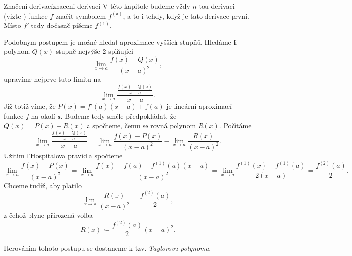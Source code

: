 \begin{remark}{Značení derivací}{znaceni-derivaci}
 V této kapitole budeme vždy $n$-tou derivaci (vizte
 ) funkce $f$ značit symbolem
 $f^{(n)}$, a to i tehdy, když je tato derivace první. Místo $f'$ tedy dočasně 
 píšeme $f^{(1)}$.
\end{remark}

Podobným postupem je možné hledat aproximace vyšších stupňů. Hledáme-li polynom
$Q(x)$ stup\-ně nejvýše $2$ splňující
\[
 \lim_{x \to a} \frac{f(x) - Q(x)}{(x-a)^2},
\]
upravíme nejprve tuto limitu na
\[
 \lim_{x \to a} \frac{\frac{f(x) - Q(x)}{x-a}}{x-a}.
\]
Již totiž víme, že $P(x) = f'(a)(x-a) + f(a)$ je lineární aproximací funkce $f$
na okolí $a$. Budeme tedy směle předpokládat, že $Q(x) = P(x) + R(x)$ a
spočteme, čemu se rovná polynom $R(x)$. Počítáme
\[
 \lim_{x \to a} \frac{\frac{f(x) - Q(x)}{x-a}}{x-a} = \lim_{x \to a} \frac{f(x)
 - P(x)}{(x-a)^2} - \lim_{x \to a} \frac{R(x)}{(x-a)^2}.
\]
Užitím \hyperref[thm:lhospitalovo-pravidlo]{l'Hospitalova pravidla} spočteme
\[
 \lim_{x \to a} \frac{f(x) - P(x)}{(x-a)^2} = \lim_{x \to a} \frac{f(x) - f(a) -
 f^{(1)}(a)(x-a)}{(x-a)^2} = \lim_{x \to a} \frac{f^{(1)}(x) -
f^{(1)}(a)}{2(x-a)} = \frac{f^{(2)}(a)}{2}.
\]
Chceme tudíž, aby platilo
\[
 \lim_{x \to a} \frac{R(x)}{(x-a)^2} = \frac{f^{(2)}(a)}{2},
\]
z čehož plyne přirozená volba
\[
 R(x) \coloneqq \frac{f^{(2)}(a)}{2}(x-a)^2.
\]

Iterováním tohoto postupu se dostaneme k tzv. \emph{Taylorovu polynomu}.





